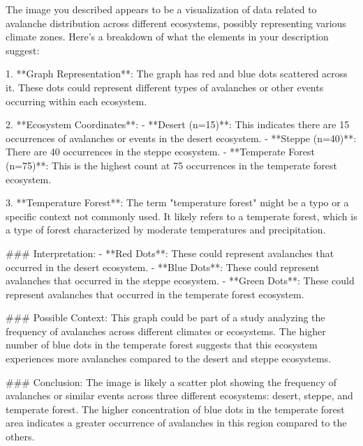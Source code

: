 The image you described appears to be a visualization of data related to avalanche distribution across different ecosystems, possibly representing various climate zones. Here's a breakdown of what the elements in your description suggest:

1. **Graph Representation**: The graph has red and blue dots scattered across it. These dots could represent different types of avalanches or other events occurring within each ecosystem.

2. **Ecosystem Coordinates**:
   - **Desert (n=15)**: This indicates there are 15 occurrences of avalanches or events in the desert ecosystem.
   - **Steppe (n=40)**: There are 40 occurrences in the steppe ecosystem.
   - **Temperate Forest (n=75)**: This is the highest count at 75 occurrences in the temperate forest ecosystem.

3. **Temperature Forest**: The term "temperature forest" might be a typo or a specific context not commonly used. It likely refers to a temperate forest, which is a type of forest characterized by moderate temperatures and precipitation.

### Interpretation:
- **Red Dots**: These could represent avalanches that occurred in the desert ecosystem.
- **Blue Dots**: These could represent avalanches that occurred in the steppe ecosystem.
- **Green Dots**: These could represent avalanches that occurred in the temperate forest ecosystem.

### Possible Context:
This graph could be part of a study analyzing the frequency of avalanches across different climates or ecosystems. The higher number of blue dots in the temperate forest suggests that this ecosystem experiences more avalanches compared to the desert and steppe ecosystems.

### Conclusion:
The image is likely a scatter plot showing the frequency of avalanches or similar events across three different ecosystems: desert, steppe, and temperate forest. The higher concentration of blue dots in the temperate forest area indicates a greater occurrence of avalanches in this region compared to the others.